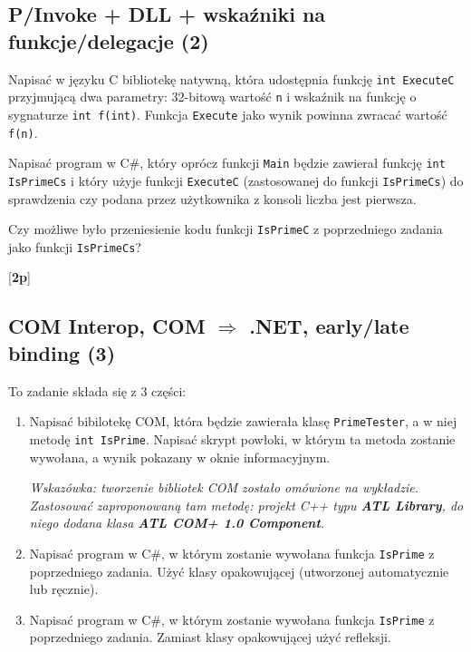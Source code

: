 \subsection{P/Invoke + DLL + wskaźniki na funkcje/delegacje (2)}

      Napisać w języku C bibliotekę natywną, która udostępnia funkcję {\tt int ExecuteC} przyjmującą
\label{pinvoke_delegate}	  
      dwa parametry: 32-bitową wartość {\tt n} i wskaźnik na funkcję o sygnaturze {\tt int f(int)}.
      Funkcja {\tt Execute} jako wynik powinna zwracać wartość {\tt f(n)}.

      Napisać program w C\#, który oprócz funkcji {\tt Main} będzie zawierał funkcję {\tt int IsPrimeCs}      
      i który użyje funkcji {\tt ExecuteC} (zastosowanej do funkcji {\tt IsPrimeCs}) do sprawdzenia
      czy podana przez użytkownika z konsoli liczba jest pierwsza.

      Czy możliwe było przeniesienie kodu funkcji {\tt IsPrimeC} z poprzedniego zadania 
      jako funkcji {\tt IsPrimeCs}?

      [{\bf 2p}]

\subsection{COM Interop, COM $\Rightarrow$ .NET, early/late binding (3)}

      To zadanie składa się z 3 części:
\label{cominterop}	  
      
      \begin{enumerate}

      \item
      Napisać bibilotekę COM, która będzie zawierała klasę {\tt PrimeTester}, a w niej metodę {\tt int IsPrime}.
      Napisać skrypt powłoki, w którym ta metoda zostanie wywołana, a wynik pokazany w oknie
      informacyjnym.
      
      {\em Wskazówka: tworzenie bibliotek COM zostało omówione na wykładzie. Zastosować zaproponowaną tam
      metodę: projekt C++ typu {\bf ATL Library}, do niego dodana klasa {\bf ATL COM+ 1.0 Component}.}

      \item
      Napisać program w C\#, w którym zostanie wywołana funkcja {\tt IsPrime} z poprzedniego zadania. 
      Użyć klasy opakowującej (utworzonej automatycznie lub ręcznie).

      \item
      Napisać program w C\#, w którym zostanie wywołana funkcja {\tt IsPrime} z poprzedniego zadania. 
      Zamiast klasy opakowującej użyć refleksji.
      \end{enumerate}
            

